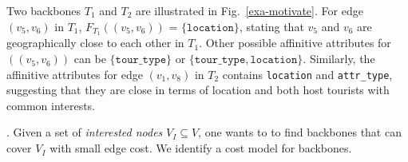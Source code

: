 \begin{example}
Two backbones $T_1$ and
$T_2$ are
illustrated in Fig.~\ref{exa-motivate}.
For edge $(v_5,v_6)$ in $T_1$,
$F_{T_1}((v_5, v_6))$ = $\{\texttt{location}\}$,
stating that $v_5$ and $v_6$ are geographically close to each other
in $T_1$. Other possible affinitive
attributes for $((v_5,v_6))$
can be $\{\texttt{tour\_type}\}$ or
 $\{\texttt{tour\_type}, \texttt{location}\}$.
Similarly, the affinitive attributes
for edge $(v_1, v_8)$ in $T_2$ contains
\texttt{location} and \texttt{attr\_type},
suggesting that they are close
in terms of location and both host
tourists with common interests.
\end{example}


\vspace{-.5ex}
. Given a set of {\em interested nodes} $V_I\subseteq V$,
one wants to to
find backbones that can cover
$V_I$ with small edge cost. We identify
a cost model for backbones.

